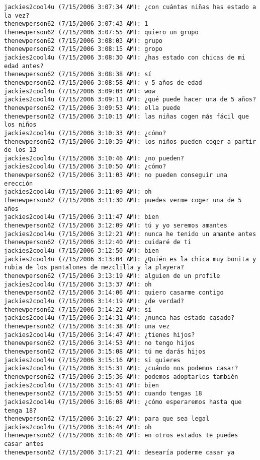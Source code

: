 \begin{verbatim}
jackies2cool4u (7/15/2006 3:07:34 AM): ¿con cuántas niñas has estado a la vez?
thenewperson62 (7/15/2006 3:07:43 AM): 1
thenewperson62 (7/15/2006 3:07:55 AM): quiero un grupo
thenewperson62 (7/15/2006 3:08:03 AM): grupo
thenewperson62 (7/15/2006 3:08:15 AM): gropo
jackies2cool4u (7/15/2006 3:08:30 AM): ¿has estado con chicas de mi edad antes?
thenewperson62 (7/15/2006 3:08:38 AM): sí
thenewperson62 (7/15/2006 3:08:58 AM): y 5 años de edad
jackies2cool4u (7/15/2006 3:09:03 AM): wow
jackies2cool4u (7/15/2006 3:09:11 AM): ¿qué puede hacer una de 5 años?
thenewperson62 (7/15/2006 3:09:53 AM): ella puede
thenewperson62 (7/15/2006 3:10:15 AM): las niñas cogen más fácil que los niños
jackies2cool4u (7/15/2006 3:10:33 AM): ¿cómo?
thenewperson62 (7/15/2006 3:10:39 AM): los niños pueden coger a partir de los 13
jackies2cool4u (7/15/2006 3:10:46 AM): ¿no pueden?
jackies2cool4u (7/15/2006 3:10:50 AM): ¿cómo?
thenewperson62 (7/15/2006 3:11:03 AM): no pueden conseguir una erección
jackies2cool4u (7/15/2006 3:11:09 AM): oh
thenewperson62 (7/15/2006 3:11:30 AM): puedes verme coger una de 5 años
jackies2cool4u (7/15/2006 3:11:47 AM): bien
thenewperson62 (7/15/2006 3:12:09 AM): tú y yo seremos amantes
jackies2cool4u (7/15/2006 3:12:21 AM): nunca he tenido un amante antes
thenewperson62 (7/15/2006 3:12:40 AM): cuidaré de ti
jackies2cool4u (7/15/2006 3:12:50 AM): bien
jackies2cool4u (7/15/2006 3:13:04 AM): ¿Quién es la chica muy bonita y rubia de los pantalones de mezclilla y la playera?
thenewperson62 (7/15/2006 3:13:19 AM): alguien de un profile
jackies2cool4u (7/15/2006 3:13:37 AM): oh 
thenewperson62 (7/15/2006 3:14:06 AM): quiero casarme contigo
jackies2cool4u (7/15/2006 3:14:19 AM): ¿de verdad?
thenewperson62 (7/15/2006 3:14:22 AM): sí
jackies2cool4u (7/15/2006 3:14:31 AM): ¿nunca has estado casado?
thenewperson62 (7/15/2006 3:14:38 AM): una vez
jackies2cool4u (7/15/2006 3:14:47 AM): ¿tienes hijos?
thenewperson62 (7/15/2006 3:14:53 AM): no tengo hijos
thenewperson62 (7/15/2006 3:15:08 AM): tú me darás hijos
jackies2cool4u (7/15/2006 3:15:16 AM): si quieres
jackies2cool4u (7/15/2006 3:15:31 AM): ¿cuándo nos podemos casar?
thenewperson62 (7/15/2006 3:15:36 AM): podemos adoptarlos también
jackies2cool4u (7/15/2006 3:15:41 AM): bien
thenewperson62 (7/15/2006 3:15:55 AM): cuando tengas 18
jackies2cool4u (7/15/2006 3:16:08 AM): ¿cómo esperaremos hasta que tenga 18?
thenewperson62 (7/15/2006 3:16:27 AM): para que sea legal
jackies2cool4u (7/15/2006 3:16:44 AM): oh
thenewperson62 (7/15/2006 3:16:46 AM): en otros estados te puedes casar antes
thenewperson62 (7/15/2006 3:17:21 AM): desearía poderme casar ya

\end{verbatim}
